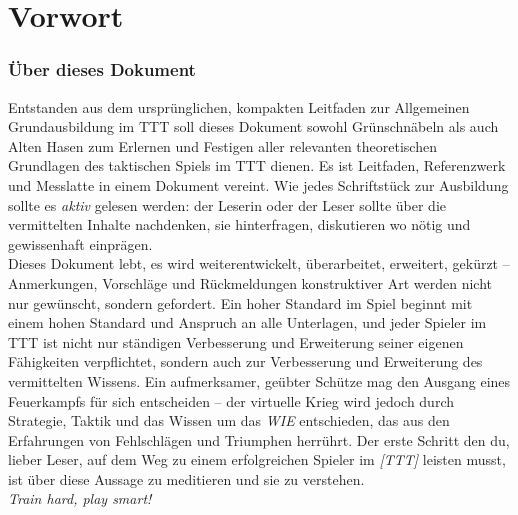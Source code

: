 \chapter*{Vorwort}
\subsection*{Über dieses Dokument}
	Entstanden aus dem ursprünglichen, kompakten Leitfaden zur Allgemeinen Grundausbildung im \ac{TTT} soll dieses Dokument sowohl Grünschnäbeln als auch Alten Hasen zum Erlernen und Festigen aller relevanten theoretischen Grundlagen des taktischen Spiels im \ac{TTT} dienen. Es ist Leitfaden, Referenzwerk und Messlatte in einem Dokument vereint. Wie jedes Schriftstück zur Ausbildung sollte es \textit{aktiv} gelesen werden: der Leserin oder der Leser sollte über die vermittelten Inhalte nachdenken, sie hinterfragen, diskutieren wo nötig und gewissenhaft einprägen.\\
	Dieses Dokument lebt, es wird weiterentwickelt, überarbeitet, erweitert, gekürzt -- Anmerkungen, Vorschläge und Rückmeldungen konstruktiver Art werden nicht nur gewünscht, sondern gefordert. Ein hoher Standard im Spiel beginnt mit einem hohen Standard und Anspruch an alle Unterlagen, und jeder Spieler im \ac{TTT} ist nicht nur ständigen Verbesserung und Erweiterung seiner eigenen Fähigkeiten verpflichtet, sondern auch zur Verbesserung und Erweiterung des vermittelten Wissens. Ein aufmerksamer, geübter Schütze mag den Ausgang eines Feuerkampfs für sich entscheiden -- der virtuelle Krieg wird jedoch durch Strategie, Taktik und das Wissen um das \textit{WIE} entschieden, das aus den Erfahrungen von Fehlschlägen und Triumphen herrührt. Der erste Schritt den du, lieber Leser, auf dem Weg zu einem erfolgreichen Spieler im \emph{[\ac{TTT}]} leisten musst, ist über diese Aussage zu meditieren und sie zu verstehen.\\

\textit{Train hard, play smart!}

\newpage
